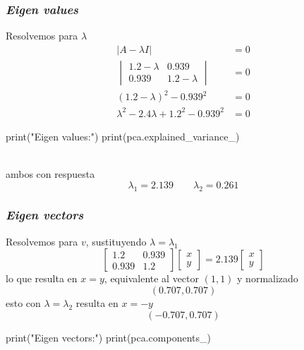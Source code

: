 \subsubsection{\textit{Eigen values}}
\begin{minipage}[c]{0.48\textwidth}
Resolvemos para $\lambda$
\begin{align*}
|A-\lambda I| &= 0\\
\begin{vmatrix}
1.2-\lambda & 0.939\\
0.939 & 1.2-\lambda
\end{vmatrix} &= 0\\
(1.2-\lambda)^2-0.939^2 &= 0\\
\lambda^2-2.4\lambda+1.2^2-0.939^2 &= 0
\end{align*}
\end{minipage}
\hfill\vrule\hfill
\begin{minipage}[c]{0.48\textwidth}
\begin{jupyter}{6}
print("Eigen values:")
print(pca.explained_variance_)
\end{jupyter}
\end{minipage}\\
ambos con respuesta
\[ \lambda_1=2.139 \qquad \lambda_2=0.261 \]
\subsubsection{\textit{Eigen vectors}}
\begin{minipage}[c]{0.48\textwidth}
Resolvemos para $v$, sustituyendo $\lambda=\lambda_1$
\[ \begin{bmatrix}
1.2 & 0.939\\
0.939 & 1.2
\end{bmatrix}
\begin{bmatrix}
x\\
y
\end{bmatrix} = 2.139
\begin{bmatrix}
x\\
y
\end{bmatrix}\]
lo que resulta en $x=y$, equivalente al vector $(1,1)$ y normalizado\vspace{-0.4em}
\[ (0.707, 0.707) \]
esto con $\lambda=\lambda_2$ resulta en $x=-y$\vspace{-0.4em}
\[ (-0.707, 0.707) \]
\end{minipage}
\hfill\vrule\hfill
\begin{minipage}[c]{0.48\textwidth}
\begin{jupyter}{7}
print("Eigen vectors:")
print(pca.components_)
\end{jupyter}
\end{minipage}\newpage

